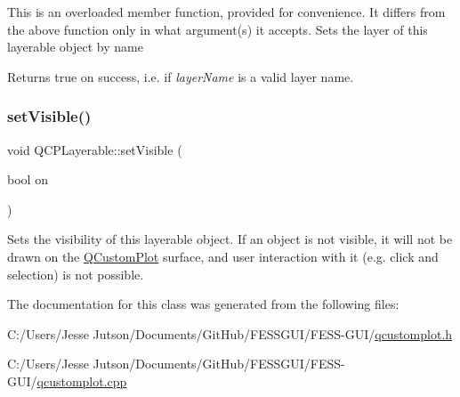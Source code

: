 This is an overloaded member function, provided for convenience. It differs from the above function only in what argument(s) it accepts. Sets the layer of this layerable object by name

Returns true on success, i.\+e. if {\itshape layer\+Name} is a valid layer name. \hypertarget{class_q_c_p_layerable_a3bed99ddc396b48ce3ebfdc0418744f8}{}\label{class_q_c_p_layerable_a3bed99ddc396b48ce3ebfdc0418744f8} 
\subsubsection{\texorpdfstring{set\+Visible()}{setVisible()}}
{\footnotesize\ttfamily void Q\+C\+P\+Layerable\+::set\+Visible (\begin{DoxyParamCaption}\item[{bool}]{on }\end{DoxyParamCaption})}

Sets the visibility of this layerable object. If an object is not visible, it will not be drawn on the \hyperlink{class_q_custom_plot}{Q\+Custom\+Plot} surface, and user interaction with it (e.\+g. click and selection) is not possible. 

The documentation for this class was generated from the following files\+:\begin{DoxyCompactItemize}
\item 
C\+:/\+Users/\+Jesse Jutson/\+Documents/\+Git\+Hub/\+F\+E\+S\+S\+G\+U\+I/\+F\+E\+S\+S-\/\+G\+U\+I/\hyperlink{qcustomplot_8h}{qcustomplot.\+h}\item 
C\+:/\+Users/\+Jesse Jutson/\+Documents/\+Git\+Hub/\+F\+E\+S\+S\+G\+U\+I/\+F\+E\+S\+S-\/\+G\+U\+I/\hyperlink{qcustomplot_8cpp}{qcustomplot.\+cpp}\end{DoxyCompactItemize}
